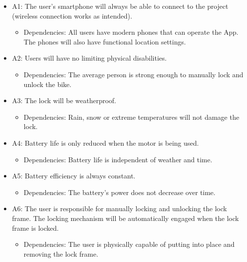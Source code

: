 \documentclass[12pt]{article}
\begin{document}
\begin{itemize}

\item A1: The user’s smartphone will always be able to connect to the project (wireless connection works as intended).
	\begin {itemize}
		\item Dependencies: All users have modern phones that can operate the App. The phones will also have functional location settings.  
	\end {itemize}
	
\item A2: Users will have no limiting physical disabilities.
	\begin {itemize}
		\item Dependencies: The average person is strong enough to manually lock and unlock the bike.
	\end {itemize}
	
\item A3: The lock will be weatherproof.
	\begin {itemize}
		\item Dependencies: Rain, snow or extreme temperatures will not damage the lock. 
	\end {itemize}
	
\item A4: Battery life is only reduced when the motor is being used.
	\begin {itemize} 
		\item Dependencies: Battery life is independent of weather and time.
	\end {itemize}

\item A5: Battery efficiency is always constant.
	\begin {itemize}
		\item Dependencies: The battery's power does not decrease over time.
	\end {itemize}
	
\item A6: The user is responsible for manually locking and unlocking the lock frame. The locking mechanism will be automatically engaged when the lock frame is locked.
	\begin {itemize}
		\item Dependencies: The user is physically capable of putting into place and removing the lock frame.
	\end {itemize}


\end{itemize}
\end{document}
